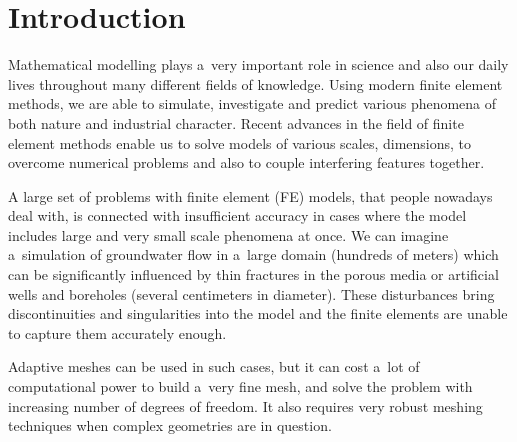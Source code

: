 \documentclass[dvipsnames,FM,Dis]{tulthesis}
\begin{document}
\tableofcontents

\clearpage



\chapter{Introduction}





Mathematical modelling plays a~very important role in science and also our daily lives throughout many different
fields of knowledge. Using modern finite element methods, we are able to simulate, investigate and predict
various phenomena of both nature and industrial character. Recent advances in the field of finite element methods
enable us to solve models of various scales, dimensions, to overcome numerical problems and also 
to couple interfering features together.

A large set of problems with finite element (FE) models, that people nowadays deal with, is connected with 
insufficient accuracy in cases where the model includes large and very small scale phenomena at once.
We can imagine a~simulation of groundwater flow in a~large domain (hundreds of meters) which can be significantly
influenced by thin fractures in the porous media or artificial wells and boreholes (several centimeters in diameter).
These disturbances bring discontinuities and singularities into the model and the finite elements are
unable to capture them accurately enough.

Adaptive meshes can be used in such cases, but it can cost a~lot of computational power to build a~very fine mesh,
and solve the problem with increasing number of degrees of freedom.
It also requires very robust meshing techniques when complex geometries are in question.
\end{document}
